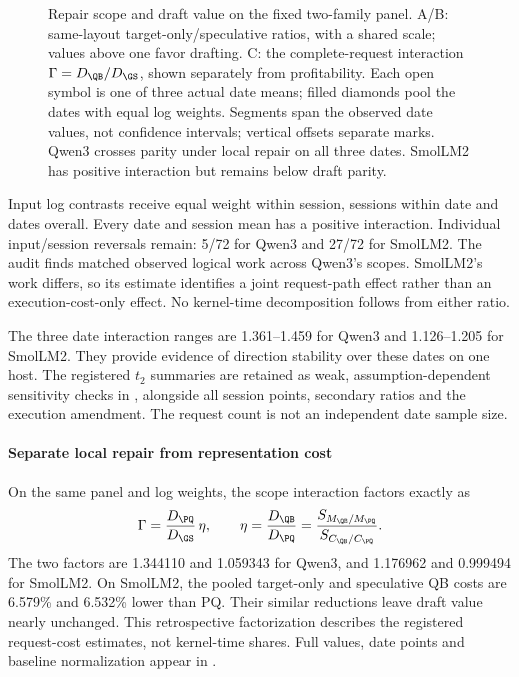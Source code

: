 \begin{figure}[t]\centering

\caption{Repair scope and draft value on the fixed two-family panel. A/B: same-layout target-only/speculative ratios, with a shared scale; values above one favor drafting. C: the complete-request interaction $\Gamma=D_{\QB}/D_{\GS}$, shown separately from profitability. Each open symbol is one of three actual date means; filled diamonds pool the dates with equal log weights. Segments span the observed date values, not confidence intervals; vertical offsets separate marks. Qwen3 crosses parity under local repair on all three dates. SmolLM2 has positive interaction but remains below draft parity.}
\label{fig:scopefinal}
\end{figure}

Input log contrasts receive equal weight within session, sessions within date and dates overall. Every date and session mean has a positive interaction. Individual input/session reversals remain: 5/72 for Qwen3 and 27/72 for SmolLM2. The audit finds matched observed logical work across Qwen3's scopes. SmolLM2's work differs, so its estimate identifies a joint request-path effect rather than an execution-cost-only effect. No kernel-time decomposition follows from either ratio.

The three date interaction ranges are 1.361--1.459 for Qwen3 and 1.126--1.205 for SmolLM2. They provide evidence of direction stability over these dates on one host. The registered $t_2$ summaries are retained as weak, assumption-dependent sensitivity checks in , alongside all session points, secondary ratios and the execution amendment. The request count is not an independent date sample size.

\paragraph{Separate local repair from representation cost}
On the same panel and log weights, the scope interaction factors exactly as
\begin{equation}
\Gamma=\frac{D_{\PQ}}{D_{\GS}}\,\eta,
\qquad \eta=\frac{D_{\QB}}{D_{\PQ}}
=\frac{S_{M_{\QB}/M_{\PQ}}}{S_{C_{\QB}/C_{\PQ}}}.
\label{eq:scopedecomposition}
\end{equation}
The two factors are 1.344110 and 1.059343 for Qwen3, and 1.176962 and 0.999494 for SmolLM2. On SmolLM2, the pooled target-only and speculative QB costs are 6.579\% and 6.532\% lower than PQ. Their similar reductions leave draft value nearly unchanged. This retrospective factorization describes the registered request-cost estimates, not kernel-time shares. Full values, date points and baseline normalization appear in .

